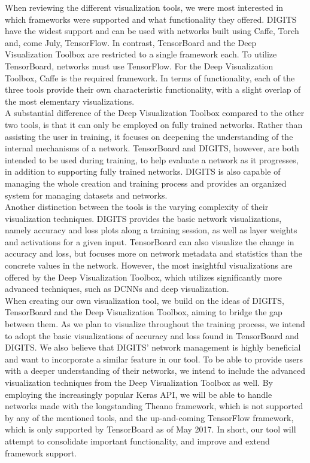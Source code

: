 When reviewing the different visualization tools, we were most interested in which frameworks were supported and what functionality they offered. DIGITS have the widest support and can be used with networks built using Caffe, Torch and, come July, TensorFlow. In contrast, TensorBoard and the Deep Visualization Toolbox are restricted to a single framework each. To utilize TensorBoard, networks must use TensorFlow. For the Deep Visualization Toolbox, Caffe is the required framework. In terms of functionality, each of the three tools provide their own characteristic functionality, with a slight overlap of the most elementary visualizations. \\

\noindent A substantial difference of the Deep Visualization Toolbox compared to the other two tools, is that it can only be employed on fully trained networks. Rather than assisting the user in training, it focuses on deepening the understanding of the internal mechanisms of a network. TensorBoard and DIGITS, however, are both intended to be used during training, to help evaluate a network as it progresses, in addition to supporting fully trained networks. DIGITS is also capable of managing the whole creation and training process and provides an organized system for managing datasets and networks. \\

\noindent Another distinction between the tools is the varying complexity of their visualization techniques. DIGITS provides the basic network visualizations, namely accuracy and loss plots along a training session, as well as layer weights and activations for a given input. TensorBoard can also visualize the change in accuracy and loss, but focuses more on network metadata and statistics than the concrete values in the network. However, the most insightful visualizations are offered by the Deep Visualization Toolbox, which utilizes significantly more advanced techniques, such as DCNNs and deep visualization. \\

\noindent When creating our own visualization tool, we build on the ideas of DIGITS, TensorBoard and the Deep Visualization Toolbox, aiming to bridge the gap between them. As we plan to visualize throughout the training process, we intend to adopt the basic visualizations of accuracy and loss found in TensorBoard and DIGITS. We also believe that DIGITS' network management is highly beneficial and want to incorporate a similar feature in our tool. To be able to provide users with a deeper understanding of their networks, we intend to include the advanced visualization techniques from the Deep Visualization Toolbox as well. By employing the increasingly popular Keras API, we will be able to handle networks made with the longstanding Theano framework, which is not supported by any of the mentioned tools, and the up-and-coming TensorFlow framework, which is only supported by TensorBoard as of May 2017. In short, our tool will attempt to consolidate important functionality, and improve and extend framework support.

